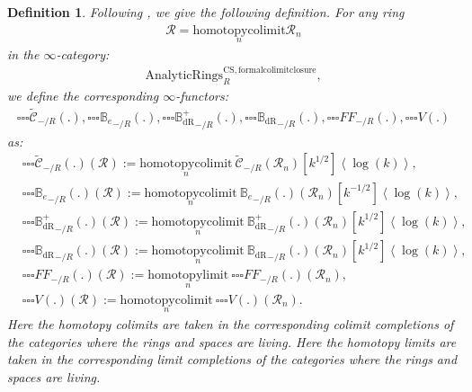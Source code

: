 \documentclass[12pt]{book}
\newtheorem{definition}{Definition}
\begin{document}
\begin{definition}
Following \cite[Definition 9.3.3, Definition 9.3.5, Definition 9.3.11, Definition 9.3.9]{KL1}, \cite{KL2} we give the following definition. For any ring
\begin{align}
\mathcal{R}=\underset{n}{\mathrm{homotopycolimit}}\mathcal{R}_n	
\end{align}
in the $\infty$-category:
\begin{align}
\mathrm{AnalyticRings}^\mathrm{CS,formalcolimitclosure}_R,	
\end{align}	
we define the corresponding $\infty$-functors:
\begin{align}
{\square\square\square}\widetilde{\mathcal{C}}_{-/R}(.),{\square\square\square}{\mathbb{B}_e}_{-/R}(.),{\square\square\square}{\mathbb{B}_\mathrm{dR}^+}_{-/R}(.),{\square\square\square}{\mathbb{B}_\mathrm{dR}}_{-/R}(.),{\square\square\square}{FF}_{-/R}(.),{\square\square\square}V(.)	
\end{align}
as:
\begin{align}
&{\square\square\square}\widetilde{\mathcal{C}}_{-/R}(.)(\mathcal{R}):=\underset{n}{\mathrm{homotopycolimit}}~\widetilde{\mathcal{C}}_{-/R}(\mathcal{R}_n)[k^{1/2}]\left<\log(k)\right>,\\
&{\square\square\square}{\mathbb{B}_e}_{-/R}(.)(\mathcal{R}):=\underset{n}{\mathrm{homotopycolimit}}~{\mathbb{B}_e}_{-/R}(.)(\mathcal{R}_n)[k^{-1/2}]\left<\log(k)\right>,\\
&{\square\square\square}{\mathbb{B}_\mathrm{dR}^+}_{-/R}(.)(\mathcal{R}):=\underset{n}{\mathrm{homotopycolimit}}~{\mathbb{B}_\mathrm{dR}^+}_{-/R}(.)(\mathcal{R}_n)[k^{1/2}]\left<\log(k)\right>,\\
&{\square\square\square}{\mathbb{B}_\mathrm{dR}}_{-/R}(.)(\mathcal{R}):=\underset{n}{\mathrm{homotopycolimit}}~{\mathbb{B}_\mathrm{dR}}_{-/R}(.)(\mathcal{R}_n)[k^{1/2}]\left<\log(k)\right>,\\
&{\square\square\square}{{FF}}_{-/R}(.)(\mathcal{R}):=\underset{n}{\mathrm{homotopylimit}}~{\square\square\square}{{FF}}_{-/R}(.)(\mathcal{R}_n),\\	
&{\square\square\square}V(.)(\mathcal{R}):=\underset{n}{\mathrm{homotopycolimit}}~{\square\square\square}V(.)(\mathcal{R}_n).
\end{align}
Here the homotopy colimits are taken in the corresponding colimit completions of the categories where the rings and spaces are living. Here the homotopy limits are taken in the corresponding limit completions of the categories where the rings and spaces are living.
\end{definition}
\end{document}
